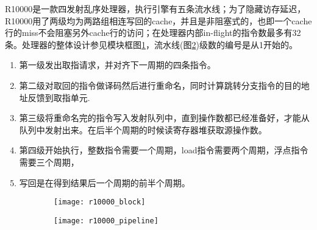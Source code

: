 R10000是一款四发射乱序处理器，执行引擎有五条流水线；为了隐藏访存延迟，R10000用了两级均为两路组相连写回的cache，并且是非阻塞式的，也即一个cache行的miss不会阻塞另外cache行的访问；在处理器内部in-flight的指令数最多有32条\citep{MIPS1996}。处理器的整体设计参见模块框图\ref{fig:r10000_block}，流水线(图\ref{fig:r10000_pipeline})级数的编号是从1开始的。
\begin{enumerate}[label=(\arabic*)]
	\item 第一级发出取指请求，并对齐下一周期的四条指令。
	\item 第二级对取回的指令做译码然后进行重命名，同时计算跳转分支指令的目的地址反馈到取指单元.
	\item 第三级将重命名完的指令写入发射队列中，直到操作数都已经准备好，才能从队列中发射出来。在后半个周期的时候读寄存器堆获取源操作数。
	\item 第四级开始执行，整数指令需要一个周期，load指令需要两个周期，浮点指令需要三个周期，
	\item 写回是在得到结果后一个周期的前半个周期。
\end{enumerate}
\begin{figure}[!htbp]
\centering
\begin{subfigure}[b]{0.7\textwidth}
	\texttt{[image: r10000\_block]}
	\caption{}
	\label{fig:r10000_block}
\end{subfigure}
\begin{subfigure}[b]{0.7\textwidth}
	\texttt{[image: r10000\_pipeline]}
	\caption{}
	\label{fig:r10000_pipeline}
\end{subfigure}
\label{fig:r10000_total}
\end{figure}

